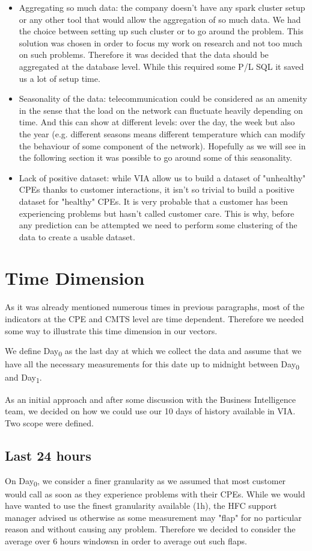 \begin{itemize}
    \item Aggregating so much data: the company doesn't have any spark cluster setup or any other tool that would allow the aggregation of so much data. We had the choice between setting up such cluster or to go around the problem. This solution was chosen in order to focus my work on research and not too much on such problems. Therefore it was decided that the data should be aggregated at the database level. While this required some P/L SQL it saved us a lot of setup time. 
    \item Seasonality of the data: telecommunication could be considered as an amenity in the sense that the load on the network can fluctuate heavily depending on time. And this can show at different levels: over the day, the week but also the year (e.g. different seasons means different temperature which can modify the behaviour of some component of the network). Hopefully as we will see in the following section it was possible to go around some of this seasonality.
    \item Lack of positive dataset: while VIA allow us to build a dataset of "unhealthy" CPEs thanks to customer interactions, it isn't so trivial to build a positive dataset for "healthy" CPEs. It is very probable that a customer has been experiencing problems but hasn't called customer care. This is why, before any prediction can be attempted we need to perform some clustering of the data to create a usable dataset. 
\end{itemize}

\section{Time Dimension}
As it was already mentioned numerous times in previous paragraphs, most of the indicators at the CPE and CMTS level are time dependent. Therefore we needed some way to illustrate this time dimension in our vectors. 

We define Day\textsubscript{0} as the last day at which we collect the data and assume that we have all the necessary measurements for this date up to midnight between Day\textsubscript{0} and Day\textsubscript{1}.

As an initial approach and after some discussion with the Business Intelligence team, we decided on how we could use our 10 days of history available in VIA. Two scope were defined.

\subsection{Last 24 hours}
On Day\textsubscript{0}, we consider a finer granularity as we assumed that most customer would call as soon as they experience problems with their CPEs. While we would have wanted to use the finest granularity available (1h), the HFC support manager advised us otherwise as some measurement may "flap" for no particular reason and without causing any problem. Therefore we decided to consider the average over 6 hours windowsn in order to average out such flaps.

